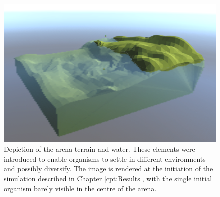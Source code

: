 \begin{figure}
  \begin{center}
  \includegraphics[width=\textwidth]{figure/arena}
  \caption{
    Depiction of the arena terrain and water. These elements were introduced to enable organisms to settle in different environments and possibly diversify. The image is rendered at the initiation of the simulation described in Chapter \ref{cpt:Results}, with the single initial organism barely visible in the centre of the arena.
  }
  \label{fig:arena}
  \end{center}
\end{figure}

